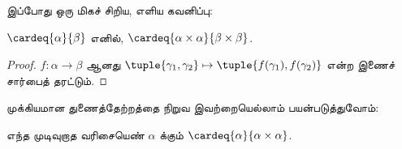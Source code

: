 \documentclass[../../../include/open-logic-section]{subfiles}
\begin{document}
இப்போது ஒரு மிகச் சிறிய, எளிய கவனிப்பு:

\begin{prop}
$\cardeq{\alpha}{\beta}$ எனில்,
$\cardeq{\alpha \times \alpha}{\beta \times \beta}$.
\end{prop}

\begin{proof}
$f \colon \alpha \to \beta$ ஆனது
$\tuple{\gamma_1, \gamma_2} \mapsto
\tuple{f(\gamma_1), f(\gamma_2)}$ என்ற இணைச் சார்பைத் தரட்டும்.
\end{proof}
\noindent

முக்கியமான துணைத்தேற்றத்தை நிறுவ இவற்றையெல்லாம் பயன்படுத்துவோம்:
\begin{lem}
எந்த முடிவுறாத வரிசையெண் $\alpha$ க்கும்
$\cardeq{\alpha}{\alpha \times \alpha}$.
\end{lem}
\end{document}
